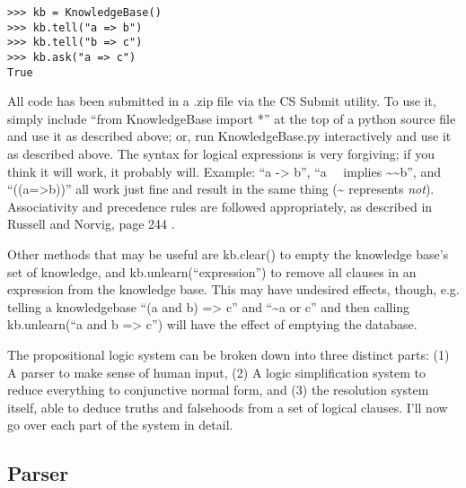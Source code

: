 \documentclass[english]{article}
\begin{document}
\begin{lstlisting}
>>> kb = KnowledgeBase()
>>> kb.tell("a => b")
>>> kb.tell("b => c")
>>> kb.ask("a => c")
True
\end{lstlisting}

All code has been submitted in a .zip file via the CS Submit utility.
To use it, simply include {}``from KnowledgeBase import {*}'' at
the top of a python source file and use it as described above; or,
run KnowledgeBase.py interactively and use it as described above.
The syntax for logical expressions is very forgiving; if you think
it will work, it probably will. Example: {}``a -> b'', {}``a $\ \ \ $
implies \textasciitilde{}\textasciitilde{}b'', and {}``((a=>b))''
all work just fine and result in the same thing (\textasciitilde{}
represents \emph{not}). Associativity and precedence rules are followed
appropriately, as described in Russell and Norvig, page 244 \cite{RussellNorvigAI}.

Other methods that may be useful are kb.clear() to empty the knowledge
base's set of knowledge, and kb.unlearn({}``expression'') to remove
all clauses in an expression from the knowledge base. This may have
undesired effects, though, e.g. telling a knowledgebase {}``(a and
b) => c'' and {}``\textasciitilde{}a or c'' and then calling kb.unlearn({}``a
and b => c'') will have the effect of emptying the database.

The propositional logic system can be broken down into three distinct
parts: (1) A parser to make sense of human input, (2) A logic simplification
system to reduce everything to conjunctive normal form, and (3) the
resolution system itself, able to deduce truths and falsehoods from
a set of logical clauses. I'll now go over each part of the system
in detail.


\subsection{Parser}
\end{document}
